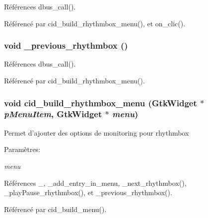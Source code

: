 Références dbus\_\-call().

Référencé par cid\_\-build\_\-rhythmbox\_\-menu(), et on\_\-clic().
\subsubsection{\setlength{\rightskip}{0pt plus 5cm}void \_\-previous\_\-rhythmbox ()}\label{cid-rhythmbox_8c_ddd855f8db8e424986a48c41ceaf0a14}




Références dbus\_\-call().

Référencé par cid\_\-build\_\-rhythmbox\_\-menu().
\subsubsection{\setlength{\rightskip}{0pt plus 5cm}void cid\_\-build\_\-rhythmbox\_\-menu (GtkWidget $\ast$ {\em pMenuItem}, \/  GtkWidget $\ast$ {\em menu})}\label{cid-rhythmbox_8c_543a017ccae2f9cfc1f0bf4aa3e38924}


Permet d'ajouter des options de monitoring pour rhythmbox \begin{Desc}
\item[Paramètres:]
\begin{description}
\item[{\em menu}]\end{description}
\end{Desc}


Références \_\-, \_\-add\_\-entry\_\-in\_\-menu, \_\-next\_\-rhythmbox(), \_\-playPause\_\-rhythmbox(), et \_\-previous\_\-rhythmbox().

Référencé par cid\_\-build\_\-menu().